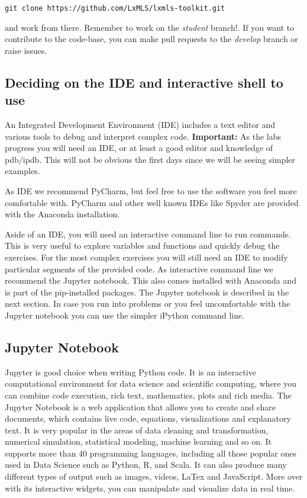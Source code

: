 \begin{verbatim}
git clone https://github.com/LxMLS/lxmls-toolkit.git 
\end{verbatim}

\noindent and work from there. Remember to work on the \textit{student} branch!. If you want to contribute to the code-base, you can make pull requests to the \textit{develop} branch or raise issues.

\subsection{Deciding on the IDE and interactive shell to use}

An Integrated Development Environment (IDE) includes a text editor and various tools to debug and interpret complex code. \textbf{Important:} As the labs progress you will need an IDE, or at least a good editor and knowledge of pdb/ipdb. This will not be obvious the first days since we will be seeing simpler examples.

As IDE we recommend PyCharm, but feel free to use the software you feel more comfortable with. PyCharm and other well known IDEs like Spyder are provided with the Anaconda installation.

Aside of an IDE, you will need an interactive command line to run commands. This is very useful to explore variables and functions and quickly debug the exercises. For the most complex exercises you will still need an IDE to modify particular segments of the provided code. As interactive command line we recommend the Jupyter notebook. This also comes installed with Anaconda and is part of the pip-installed packages. The Jupyter notebook is described in the next section. In case you run into problems or you feel uncomfortable with the Jupyter notebook you can use the simpler iPython command line.

\subsection{Jupyter Notebook}

Jupyter is good choice when writing Python code. It is an interactive computational environment for data science and scientific computing, where you can combine code execution, rich text, mathematics, plots and rich media. The Jupyter Notebook is a web application that allows you to create and share documents, which contains live code, equations, visualizations and explanatory text. It is very popular in the areas of data cleaning and transformation, numerical simulation, statistical modeling, machine learning and so on. It supports more than 40 programming languages, including all those popular ones used in Data Science such as Python, R, and Scala. It can also produce many different types of output such as images, videos, LaTex and JavaScript. More over with its interactive widgets, you can manipulate and visualize data in real time.

